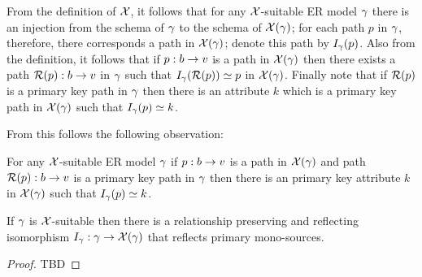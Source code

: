 From the definition of $\mathcal{X}$, it follows that for any $\mathcal{X}$-suitable ER model $\gamma$ there is an injection from the schema of $\gamma$ to the schema of $\mathcal{X}(\gamma)$; for each path $p$ in $\gamma$, therefore, there corresponds a path 
in $\mathcal{X}(\gamma)$; denote this path by  $I_\gamma(p)$. Also from the definition, it follows that
if $p:b \rightarrow v$ is a path in $\mathcal{X}(\gamma)$ then there exists a path $\mathcal{R}(p):b \rightarrow v$ in $\gamma$ such that $I_\gamma(\mathcal{R}(p)) \simeq p$ in $\mathcal{X}(\gamma)$. Finally note that if $\mathcal{R}(p)$ is a primary key path in $\gamma$ then there is an attribute $k$ which is a primary key path
in $\mathcal{X}(\gamma)$ such that $I_\gamma(p) \simeq k$. 


From this follows the following observation:

\begin{observation}
For any $\mathcal{X}$-suitable ER model $\gamma$ if $p:b \rightarrow v$ is a path in $\mathcal{X}(\gamma)$ and  path $\mathcal{R}(p):b \rightarrow v$ is a primary key path in $\gamma$  then there is an primary key attribute $k$ in $\mathcal{X}(\gamma)$ such that $I_\gamma(p) \simeq k$. 
\end{observation}

\begin{lemma}
If $\gamma$ is $\mathcal{X}$-suitable  then  there is a 
relationship preserving  and reflecting isomorphism $I_\gamma: \gamma \rightarrow \mathcal{X}(\gamma)$ that reflects primary mono-sources.
\end{lemma}
\begin{proof}
TBD 
\end{proof}


